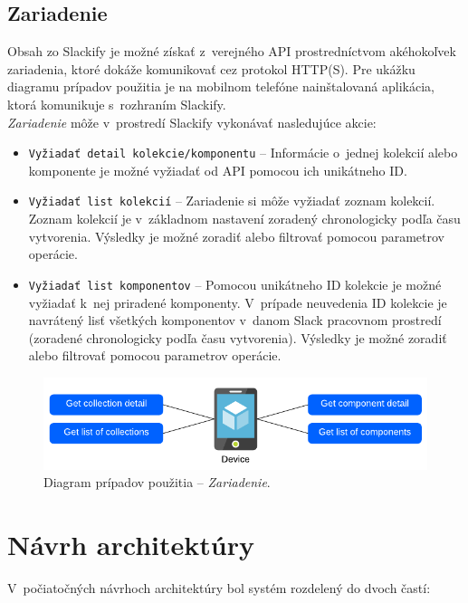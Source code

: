\subsection{Zariadenie}
Obsah zo Slackify je možné získať z~verejného API prostredníctvom akéhokoľvek zariadenia, ktoré dokáže komunikovať cez protokol HTTP(S). Pre ukážku diagramu prípadov použitia je na mobilnom telefóne nainštalovaná aplikácia, ktorá komunikuje s~rozhraním Slackify. \\

\noindent \emph{Zariadenie} môže v~prostredí Slackify vykonávať nasledujúce akcie:

\begin{itemize}
	\item \texttt{Vyžiadať detail kolekcie/komponentu} -- Informácie o~jednej kolekcií alebo komponente je možné vyžiadať od API pomocou ich unikátneho ID.
	\item \texttt{Vyžiadať list kolekcií} -- Zariadenie si môže vyžiadať zoznam kolekcií. Zoznam kolekcií je v~základnom nastavení zoradený chronologicky podľa času vytvorenia. Výsledky je možné zoradiť alebo filtrovať pomocou parametrov operácie.
	\item \texttt{Vyžiadať list komponentov} -- Pomocou unikátneho ID kolekcie je možné vyžiadať k~nej priradené komponenty. V~prípade neuvedenia ID kolekcie je navrátený lisť všetkých komponentov v~danom Slack pracovnom prostredí (zoradené chronologicky podľa času vytvorenia). Výsledky je možné zoradiť alebo filtrovať pomocou parametrov operácie.
\end{itemize}

\begin{figure}[h]
	\centering
	\includegraphics[scale=0.9]{obrazky-figures/device_use_case}
	\caption{Diagram prípadov použitia -- \emph{Zariadenie}.}
\end{figure}

\pagebreak

\section{Návrh architektúry}
\label{design:architecture}
V~počiatočných návrhoch architektúry bol systém rozdelený do dvoch častí:

